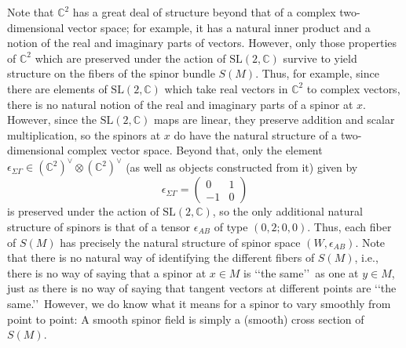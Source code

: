 Note that \(\mathbb C^2\) has a great deal of structure beyond that of a complex
two-dimensional vector space; for example, it has a natural inner product and a
notion of the real and imaginary parts of vectors. However, only those properties of
\(\mathbb C^2\) which are preserved under the action of
\(\mathrm{SL}(2,\mathbb C)\) survive to yield structure on the fibers of the spinor
bundle \(S(M)\). Thus, for example, since there are elements of
\(\mathrm{SL}(2,\mathbb C)\) which take real vectors in \(\mathbb C^2\) to complex
vectors, there is no natural notion of the real and imaginary parts of a spinor at
\(x\). However, since the \(\mathrm{SL}(2,\mathbb C)\) maps are linear, they
preserve addition and scalar multiplication, so the spinors at \(x\) do have the
natural structure of a two-dimensional complex vector space. Beyond that, only the
element \(\epsilon_{\Sigma\Gamma}\in(\mathbb C^2)^\vee\otimes(\mathbb C^2)^\vee\) (as well
as objects constructed from it) given by
\[
  \epsilon_{\Sigma\Gamma}
  =\begin{pmatrix}0&1\\-1&0\end{pmatrix}
\]
is preserved under the action of \(\mathrm{SL}(2,\mathbb C)\), so the only
additional natural structure of spinors is that of a tensor \(\epsilon_{AB}\) of
type \((0,2;0,0)\). Thus, each fiber of \(S(M)\) has precisely the natural
structure of spinor space \((W,\epsilon_{AB})\). Note that there is no natural way
of identifying the different fibers of \(S(M)\), i.e., there is no way of saying
that a spinor at \(x\in M\) is \lq\lq the same\rq\rq\ as one at \(y\in M\), just as
there is no way of saying that tangent vectors at different points are
\lq\lq the same.\rq\rq\ However, we do know what it means for a spinor to vary
smoothly from point to point: A smooth spinor field is simply a (smooth) cross
section of \(S(M)\).

